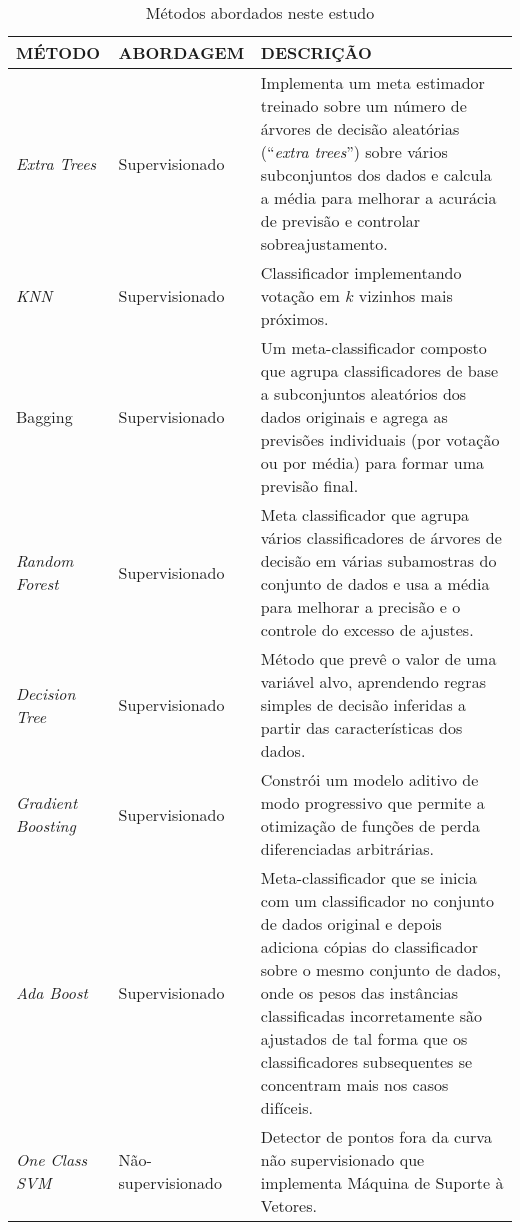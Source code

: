\documentclass[twoside]{article}
\begin{document}
\begin{table}\scriptsize
    \centering
    \begin{tabular}{l l  >{\raggedright\arraybackslash}p{100mm}}
        \toprule
        MÉTODO & ABORDAGEM & DESCRIÇÃO \\
        \midrule
        \textit{Extra Trees} & Supervisionado & Implementa um meta estimador treinado sobre um número de árvores de decisão aleatórias (``\textit{extra trees}'') sobre vários subconjuntos dos dados e calcula a média para melhorar a acurácia de previsão e controlar sobreajustamento. \\
        \textit{KNN} & Supervisionado & Classificador implementando votação em $k$ vizinhos mais próximos. \\
        Bagging & Supervisionado & Um meta-classificador composto que agrupa classificadores de base a subconjuntos aleatórios dos dados originais e agrega as previsões individuais (por votação ou por média) para formar uma previsão final. \\
        \textit{Random Forest} & Supervisionado & Meta classificador que agrupa vários classificadores de árvores de decisão em várias subamostras do conjunto de dados e usa a média para melhorar a precisão e o controle do excesso de ajustes. \\
        \textit{Decision Tree} & Supervisionado & Método que prevê o valor de uma variável alvo, aprendendo regras simples de decisão inferidas a partir das características dos dados. \\
        \textit{Gradient Boosting} & Supervisionado & Constrói um modelo aditivo de modo progressivo que permite a otimização de funções de perda diferenciadas arbitrárias. \\
        \textit{Ada Boost} & Supervisionado & Meta-classificador que se inicia com um classificador no conjunto de dados original e depois adiciona cópias do classificador sobre o mesmo conjunto de dados, onde os pesos das instâncias classificadas incorretamente são ajustados de tal forma que os classificadores subsequentes se concentram mais nos casos difíceis. \\
        \textit{One Class SVM} & Não-supervisionado & Detector de pontos fora da curva não supervisionado que implementa Máquina de Suporte à Vetores. \\
        \bottomrule
    \end{tabular}
    \caption{Métodos abordados neste estudo}
    \label{tab:metodos}
\normalsize\end{table}
\end{document}
